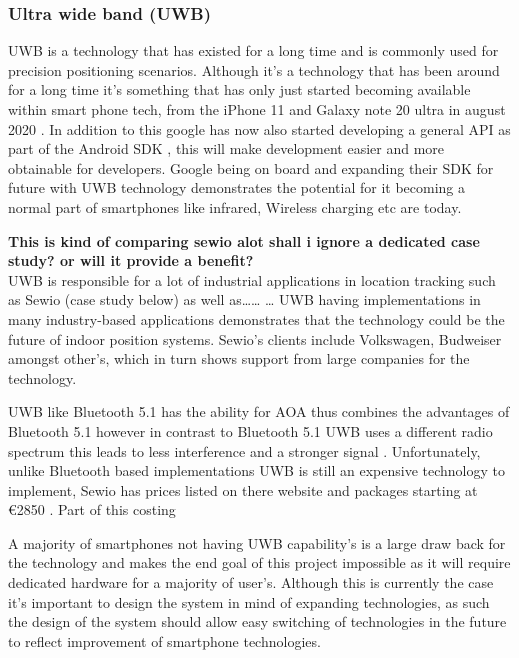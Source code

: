 \subsubsection{Ultra wide band (UWB)}
UWB is a technology that has existed for a long time and is commonly used for precision positioning scenarios. Although it’s a technology that has been around for a long time it’s something that has only just started becoming available within smart phone tech, from the iPhone 11 and Galaxy note 20 ultra in august 2020 \citetemp. In addition to this google has now also started developing a general API as part of the Android SDK \citetemp, this will make development easier and more obtainable for developers. Google being on board and expanding their SDK for future with UWB technology demonstrates the potential for it becoming a normal part of smartphones like infrared, Wireless charging etc are today.

\large{\bfseries \color{red} This is kind of comparing sewio alot shall i ignore a dedicated case study? or will it provide a benefit?}\\
UWB is responsible for a lot of industrial applications in location tracking such as Sewio (case study below) as well as…… … UWB having implementations in many industry-based applications demonstrates that the technology could be the future of indoor position systems. Sewio’s clients include Volkswagen, Budweiser amongst other’s, which in turn shows support from large companies for the technology.

UWB like Bluetooth 5.1 has the ability for AOA \citetemp thus combines the advantages of Bluetooth 5.1 however in contrast to Bluetooth 5.1 UWB uses a different radio spectrum this leads to less interference and a stronger signal \citetemp. Unfortunately, unlike Bluetooth based implementations UWB is still an expensive technology to implement, Sewio has prices listed on there website and packages starting at €2850 \citetemp. Part of this costing

A majority of smartphones not having UWB capability’s is a large draw back for the technology and makes the end goal of this project impossible as it will require dedicated hardware for a majority of user’s. Although  this is currently the case it’s important to design the system in mind of expanding technologies, as such the design of the system should allow easy switching of technologies in the future to reflect improvement of smartphone technologies.
